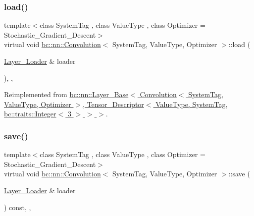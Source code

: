\subsubsection{\texorpdfstring{load()}{load()}}
{\footnotesize\ttfamily template$<$class System\+Tag , class Value\+Type , class Optimizer  = Stochastic\+\_\+\+Gradient\+\_\+\+Descent$>$ \\
virtual void \hyperlink{structbc_1_1nn_1_1Convolution}{bc\+::nn\+::\+Convolution}$<$ System\+Tag, Value\+Type, Optimizer $>$\+::load (\begin{DoxyParamCaption}\item[{\hyperlink{structbc_1_1nn_1_1Layer__Loader}{Layer\+\_\+\+Loader} \&}]{loader }\end{DoxyParamCaption})\hspace{0.3cm}{\ttfamily [inline]}, {\ttfamily [override]}, {\ttfamily [virtual]}}



Reimplemented from \hyperlink{structbc_1_1nn_1_1Layer__Base_a5b3a9854215815f810bef4922b74efaf}{bc\+::nn\+::\+Layer\+\_\+\+Base$<$ Convolution$<$ System\+Tag, Value\+Type, Optimizer $>$, Tensor\+\_\+\+Descriptor$<$ Value\+Type, System\+Tag, bc\+::traits\+::\+Integer$<$ 3 $>$ $>$ $>$}.

\mbox{\label{structbc_1_1nn_1_1Convolution_adf118eb4b92ed6f2df1ba31a0ce9e6e0}} 
\subsubsection{\texorpdfstring{save()}{save()}}
{\footnotesize\ttfamily template$<$class System\+Tag , class Value\+Type , class Optimizer  = Stochastic\+\_\+\+Gradient\+\_\+\+Descent$>$ \\
virtual void \hyperlink{structbc_1_1nn_1_1Convolution}{bc\+::nn\+::\+Convolution}$<$ System\+Tag, Value\+Type, Optimizer $>$\+::save (\begin{DoxyParamCaption}\item[{\hyperlink{structbc_1_1nn_1_1Layer__Loader}{Layer\+\_\+\+Loader} \&}]{loader }\end{DoxyParamCaption}) const\hspace{0.3cm}{\ttfamily [inline]}, {\ttfamily [override]}, {\ttfamily [virtual]}}



